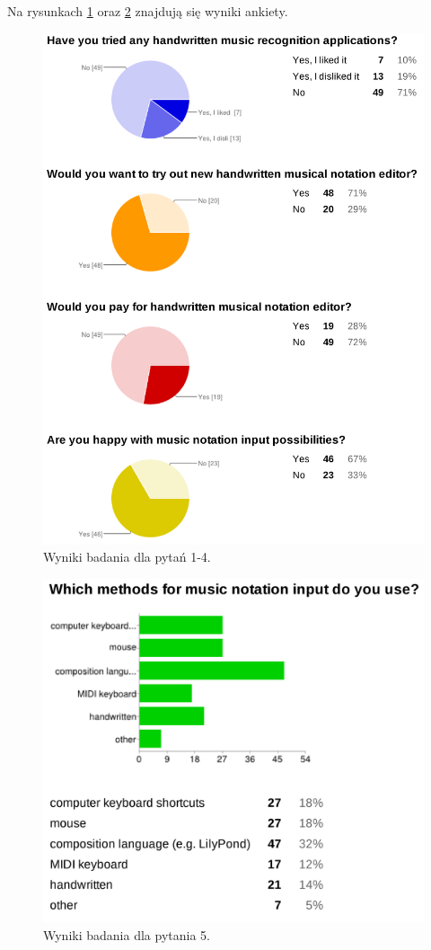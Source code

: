 \documentclass[polish,thesis,12pt]{dcsbook}
\begin{document}
Na rysunkach \ref{survey1} oraz \ref{survey2} znajdują się wyniki ankiety.

\newpage
\begin{figure}[H]
  \centering
  \includegraphics[scale=0.15,bb=0 0 2832 3800]{img/survey1.png}
  \caption{Wyniki badania dla pytań 1-4.}
  \label{survey1}
\end{figure}
\begin{figure}[H]
  \centering
  \includegraphics[scale=0.2,bb=0 0 2232 2016]{img/survey2.png}
  \caption{Wyniki badania dla pytania 5.}
  \label{survey2}
\end{figure}
\end{document}
